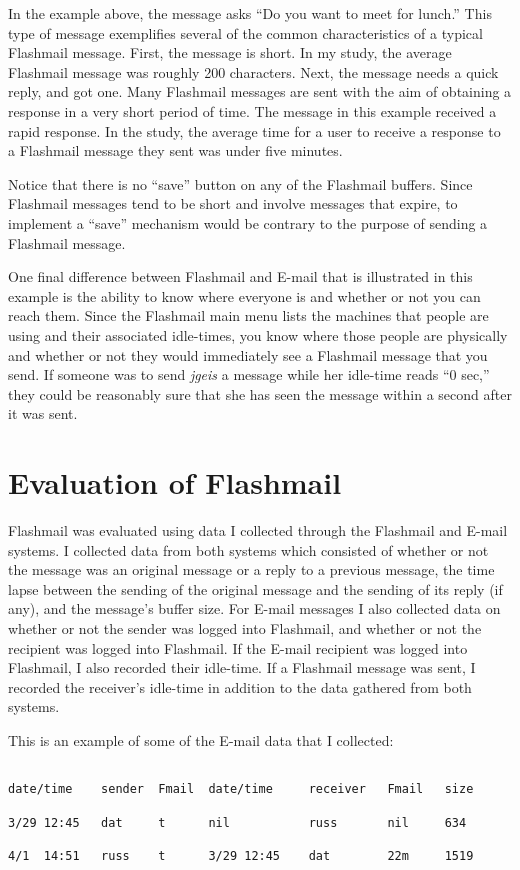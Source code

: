 In the example above,
the message asks ``Do you want to meet for lunch.''  This type of message
exemplifies several of the common characteristics of a typical Flashmail
message.  First, the message is short.  In my study, the average Flashmail message was
roughly 200 characters.  Next, the message needs a quick reply, and got
one.  Many Flashmail messages are sent with the aim of obtaining a response
in a very short period of time.  The message in this example
received a rapid response.  In the study, the average time for a user to
receive a response to a Flashmail message they sent was under five minutes.

Notice that there is no ``save'' button on any of the Flashmail buffers.
Since Flashmail messages tend to be short and involve messages that expire,
to implement a ``save'' mechanism would be contrary to the purpose of
sending a Flashmail message.

One final difference between Flashmail and E-mail that is illustrated in
this example is the ability to know where everyone is and whether or not
you can reach them.  Since the Flashmail main menu lists the machines that
people are using and their associated idle-times, you know where those
people are physically and whether or not they would immediately see a
Flashmail message that you send.  If someone was to send \textit{jgeis} a message
while her idle-time reads ``0 sec,'' they could be reasonably sure that she
has seen the message within a second after it was sent.

\section{Evaluation of Flashmail}

Flashmail was evaluated using data I collected through the Flashmail and
E-mail systems.  I collected data from both systems which consisted of
whether or not the message was an original message or a reply to a previous
message, the time lapse between the sending of the original message and the
sending of its reply (if any), and the message's buffer size.  For E-mail
messages I also collected data on whether or not the sender was logged into
Flashmail, and whether or not the recipient was logged into Flashmail.  If
the E-mail recipient was logged into Flashmail, I also recorded their
idle-time.  If a Flashmail message was sent, I recorded the receiver's
idle-time in addition to the data gathered from both systems.


This is an example of some of the E-mail data that I collected:
\begin{verbatim}              

date/time    sender  Fmail  date/time     receiver   Fmail   size
    
3/29 12:45   dat     t      nil           russ       nil     634

4/1  14:51   russ    t      3/29 12:45    dat        22m     1519


\end{verbatim}

